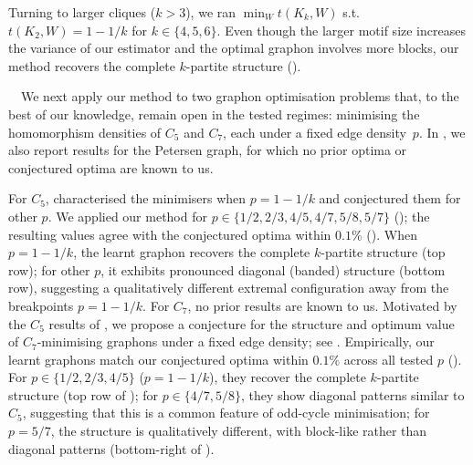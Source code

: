 \documentclass{article}
\theoremstyle{plain}
\theoremstyle{definition}
\theoremstyle{remark}
\begin{document}
Turning to larger cliques ($k > 3$), we ran $\min_W t(K_k, W)$ s.t.\ $t(K_2, W){=}1{-}1/k$ for $k\in\{4,5,6\}$. Even though the larger motif size increases the variance of our estimator and the optimal graphon involves more blocks, our method recovers the complete $k$-partite structure ().

\ $\,$
We next apply our method to two graphon optimisation problems that, to the best of our knowledge, remain open in the tested regimes: minimising the homomorphism densities of $C_5$ and $C_7$, each under a fixed edge density~$p$. In , we also report results for the Petersen graph, for which no prior optima or conjectured optima are known to us.

For $C_5$, \citet{bennett2020minimizing} characterised the minimisers when $p=1-1/k$ and conjectured them for other $p$. We applied our method for $p\in\{1/2, 2/3, 4/5, 4/7, 5/8, 5/7\}$ (); the resulting values agree with the conjectured optima within $0.1\%$ (). When $p=1-1/k$, the learnt graphon recovers the complete $k$-partite structure (top row); for other $p$, it exhibits pronounced diagonal (banded) structure (bottom row), suggesting a qualitatively different extremal configuration away from the breakpoints $p = 1-1/k$.
%
For $C_7$, no prior results are known to us. Motivated by the $C_5$ results of \citet{bennett2020minimizing}, we propose a conjecture for the structure and optimum value of $C_7$-minimising graphons under a fixed edge density; see . Empirically, our learnt graphons match our conjectured optima within $0.1\%$ across all tested $p$ (). For $p\in\{1/2,2/3,4/5\}$ ($p=1-1/k$), they recover the complete $k$-partite structure (top row of ); for $p\in\{4/7,5/8\}$, they show diagonal patterns similar to $C_5$, suggesting that this is a common feature of odd-cycle minimisation; for $p=5/7$, the structure is qualitatively different, with block-like rather than diagonal patterns (bottom-right of ).
\end{document}
